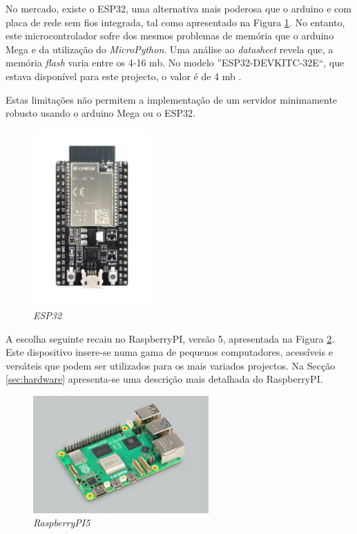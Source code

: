 No mercado, existe o \gls{ESP32}, uma alternativa mais poderosa que o \gls{arduino} e com placa de rede sem fios integrada, tal como apresentado na Figura \ref{fig:ESP32}. No entanto, este microcontrolador sofre dos mesmos problemas de memória que o \gls{arduino} Mega e da utilização do \textit{MicroPython}. Uma análise ao \textit{datasheet} \cite{esp32datasheet} revela que, a memória \textit{flash} varia entre os 4-16 \acrlong{mb}. No modelo ''ESP32-DEVKITC-32E``, que estava disponível para este projecto, o valor é de 4 \acrshort{mb} \cite{diferencaspython}.

Estas limitações não permitem a implementação de um servidor minimamente robusto usando o \gls{arduino} Mega ou o \gls{ESP32}.

\begin{figure}[hbtp]
    \centering
    \includegraphics[width=0.4\textwidth]{figures/ESP32-DevKitC_L_0.png}
    \caption{\textit{ESP32} \cite{ESPDevKit}}
    \label{fig:ESP32}
\end{figure}

A escolha seguinte recaiu no \gls{RaspberryPI}, versão 5, apresentada na Figura \ref{fig:Raspberrypi5}. Este dispositivo insere-se numa gama de pequenos computadores, acessíveis e versáteis que podem ser utilizados para os mais variados projectos. Na Secção \ref{sec:hardware} apresenta-se uma descrição mais detalhada do \gls{RaspberryPI}.

\begin{figure}[hbtp]
    \centering
    \includegraphics[width=0.6\textwidth]{figures/raspberrypi5.jpg}
    \caption{\textit{RaspberryPI5} \cite{introRaspberrypi5}}
    \label{fig:Raspberrypi5}
\end{figure}

